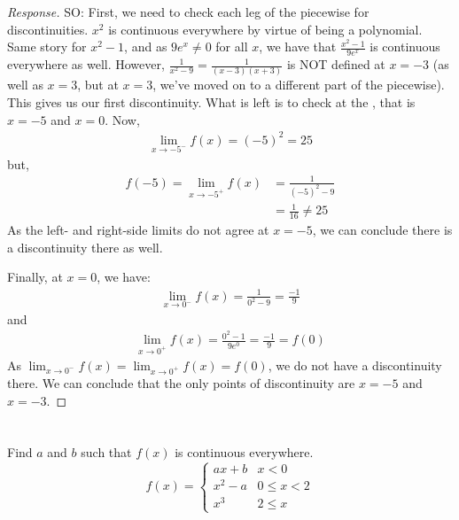 \documentclass[english]{article}
\newcommand{\prob}[1]{\setcounter{section}{#1-1}\section{}}
\theoremstyle{remark}
\theoremstyle{definition}
\newcommand{\resp}[1]{\begin{proof}[Response]{#1}\end{proof}}
\begin{document}
	\resp{ SO: First, we need to check each leg of the piecewise for discontinuities. $x^2$ is continuous everywhere by virtue of being a polynomial. Same story for $x^2-1$, and as $9e^x\neq 0$ for all $x$, we have that $\frac{x^2-1}{9e^x}$ is continuous everywhere as well. However, $\frac{1}{x^2-9}=\frac{1}{(x-3)(x+3)}$ is NOT defined at $x=-3$ (as well as $x=3$, but at $x=3$, we've moved on to a different part of the piecewise). This gives us our first discontinuity. What is left is to check at the \say{seams}, that is $x=-5$ and $x=0$. Now, \begin{align*}
			\lim_{x\to -5^-} f(x)=(-5)^2=25
	\end{align*}
but, \begin{align*}f(-5)=\lim_{x\to -5^+}f(x)&=\frac{1}{(-5)^2-9}\\&=\frac{1}{16}\neq 25\end{align*}
As the left- and right-side limits do not agree at $x=-5$, we can conclude there is a discontinuity there as well. 

Finally, at $x=0$, we have: \begin{align*}
\lim_{x\to 0^-} f(x)=\frac{1}{0^2-9}=\frac{-1}{9}
\end{align*}
and \begin{align*}
\lim_{x\to 0^+} f(x)=\frac{0^2-1}{9e^0}=\frac{-1}{9}=f(0)
\end{align*}
As $\lim_{x\to 0^-}f(x)=\lim_{x\to 0^+}f(x)=f(0)$, we do not have a discontinuity there. We can conclude that the only points of discontinuity are $x=-5$ and $x=-3$.
}

	\prob{4} Find $a$ and $b$ such that $f(x)$ is continuous everywhere.
	\begin{equation*}
	f(x)=\begin{cases}
	ax+b&x<0\\
	x^2-a &0\leq x <2\\
	x^3 & 2\leq x
	\end{cases}
	\end{equation*}
	
\end{document}
